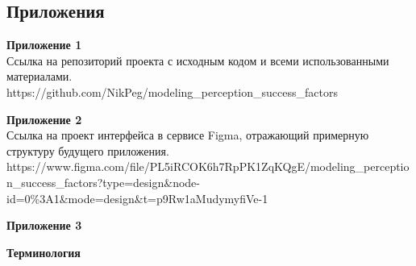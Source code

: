 \documentclass{article}
\newcommand\zz[1]{\par{\normalsize\strut #1} \hfill\ignorespaces}
\begin{document}
    \newpage
    \begin{center}
        \section*{Приложения}
    \end{center}
    \zz{}\textbf{Приложение 1\\}
    Ссылка на репозиторий проекта с исходным кодом и всеми использованными материалами.\\
    https://github.com/NikPeg/modeling\_perception\_success\_factors\\
    \zz{}\textbf{Приложение 2\\}
    Ссылка на проект интерфейса в сервисе Figma, отражающий примерную структуру будущего приложения.\\
    https://www.figma.com/file/PL5iRCOK6h7RpPK1ZqKQgE/modeling\_perception\_success\_factors?type=design\&node-id=0\%3A1&mode=design&t=p9Rw1aMudymyfiVe-1\\
    \zz{}\textbf{Приложение 3\\}
    \zz{}\textbf{Терминология\\}
\end{document}
